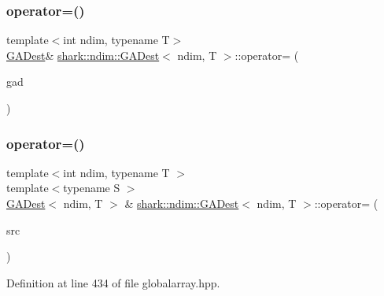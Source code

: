\subsubsection{\texorpdfstring{operator=()}{operator=()}\hspace{0.1cm}{\footnotesize\ttfamily [1/2]}}
{\footnotesize\ttfamily template$<$int ndim, typename T$>$ \\
\hyperlink{classshark_1_1ndim_1_1_g_a_dest}{G\+A\+Dest}\& \hyperlink{classshark_1_1ndim_1_1_g_a_dest}{shark\+::ndim\+::\+G\+A\+Dest}$<$ ndim, T $>$\+::operator= (\begin{DoxyParamCaption}\item[{const \hyperlink{classshark_1_1ndim_1_1_g_a_dest}{G\+A\+Dest}$<$ ndim, T $>$ \&}]{gad }\end{DoxyParamCaption})\hspace{0.3cm}{\ttfamily [delete]}}

\hypertarget{classshark_1_1ndim_1_1_g_a_dest_af05507ececbff5564c7ee32aa28918f6}{}\label{classshark_1_1ndim_1_1_g_a_dest_af05507ececbff5564c7ee32aa28918f6} 
\subsubsection{\texorpdfstring{operator=()}{operator=()}\hspace{0.1cm}{\footnotesize\ttfamily [2/2]}}
{\footnotesize\ttfamily template$<$int ndim, typename T $>$ \\
template$<$typename S $>$ \\
\hyperlink{classshark_1_1ndim_1_1_g_a_dest}{G\+A\+Dest}$<$ ndim, T $>$ \& \hyperlink{classshark_1_1ndim_1_1_g_a_dest}{shark\+::ndim\+::\+G\+A\+Dest}$<$ ndim, T $>$\+::operator= (\begin{DoxyParamCaption}\item[{const S \&}]{src }\end{DoxyParamCaption})}



Definition at line 434 of file globalarray.\+hpp.


